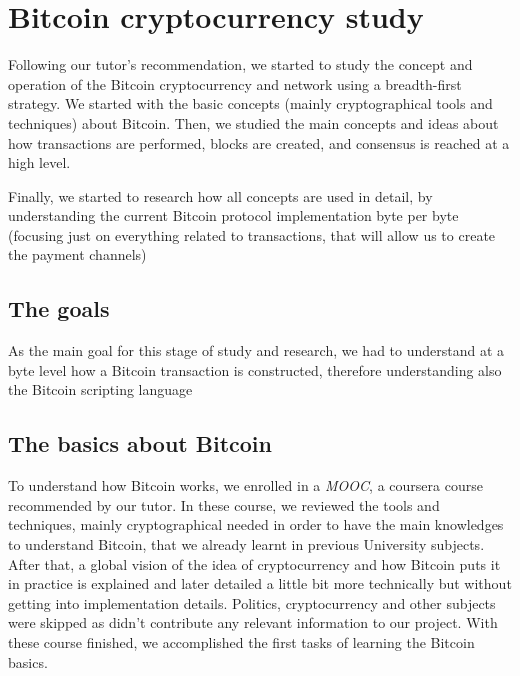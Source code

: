 \chapter*{Bitcoin cryptocurrency study}
\label{chap:bitcoin_study}
Following our tutor's recommendation, we started to study the concept and operation of the Bitcoin cryptocurrency and network using a breadth-first strategy. We started with the basic concepts (mainly cryptographical tools and techniques) about Bitcoin. Then, we studied the main concepts and ideas about how transactions are performed, blocks are created, and consensus is reached at a high level. 

Finally, we started to research how all concepts are used in detail, by understanding the current Bitcoin protocol implementation byte per byte (focusing just on everything related to transactions, that will allow us to create the payment channels)

\section{The goals}
As the main goal for this stage of study and research, we had to understand at a byte level how a Bitcoin transaction is constructed, therefore understanding also the Bitcoin scripting language

\section{The basics about Bitcoin}
To understand how Bitcoin works, we enrolled in a \textit{MOOC}, a coursera course recommended by our tutor\cite{bitcoin_coursera:online}. In these course, we reviewed the tools and techniques, mainly cryptographical needed in order to have the main knowledges to understand Bitcoin, that we already learnt in previous University subjects. After that, a global vision of the idea of cryptocurrency and how Bitcoin puts it in practice is explained and later detailed a little bit more technically but without getting into implementation details. Politics, cryptocurrency and other subjects were skipped as didn't contribute any relevant information to our project. With these course finished, we accomplished the first tasks of learning the Bitcoin basics.

